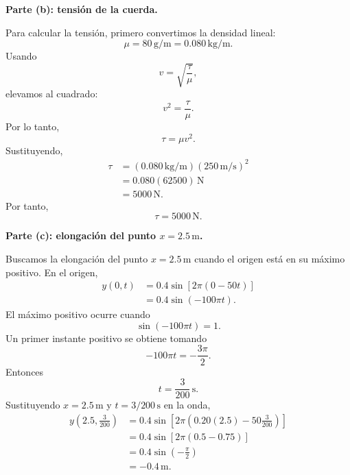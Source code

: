 \documentclass[11pt]{article}
\newcommand{\paso}[1]{%
  \par\medskip
  \noindent\textbf{#1}\par
  \vspace{0.1em}%
}
\begin{document}
\paso{Parte (b): tensi\'on de la cuerda.}
Para calcular la tensi\'on, primero convertimos la densidad lineal:
\begin{equation*}
    \mu=80\,\mathrm{g/m}=0.080\,\mathrm{kg/m}.
\end{equation*}
Usando
\begin{equation*}
    v=\sqrt{\frac{\tau}{\mu}},
\end{equation*}
elevamos al cuadrado:
\begin{equation*}
    v^2=\frac{\tau}{\mu}.
\end{equation*}
Por lo tanto,
\begin{equation*}
    \tau=\mu v^2.
\end{equation*}
Sustituyendo,
\begin{align*}
    \tau
    &=(0.080\,\mathrm{kg/m})(250\,\mathrm{m/s})^2\\
    &=0.080(62500)\,\mathrm{N}\\
    &=5000\,\mathrm{N}.
\end{align*}
Por tanto,
\begin{equation*}
    \boxed{\tau=5000\,\mathrm{N}}.
\end{equation*}

\paso{Parte (c): elongaci\'on del punto $x=2.5\,\mathrm{m}$.}
Buscamos la elongaci\'on del punto $x=2.5\,\mathrm{m}$ cuando el origen est\'a en su m\'aximo positivo. En el origen,
\begin{align*}
    y(0,t)
    &=0.4\sin\left[2\pi(0-50t)\right]\\
    &=0.4\sin(-100\pi t).
\end{align*}
El m\'aximo positivo ocurre cuando
\begin{equation*}
    \sin(-100\pi t)=1.
\end{equation*}
Un primer instante positivo se obtiene tomando
\begin{equation*}
    -100\pi t=-\frac{3\pi}{2}.
\end{equation*}
Entonces
\begin{equation*}
    t=\frac{3}{200}\,\mathrm{s}.
\end{equation*}
Sustituyendo $x=2.5\,\mathrm{m}$ y $t=3/200\,\mathrm{s}$ en la onda,
\begin{align*}
    y\left(2.5,\frac{3}{200}\right)
    &=0.4\sin\left[2\pi\left(0.20(2.5)-50\frac{3}{200}\right)\right]\\
    &=0.4\sin\left[2\pi(0.5-0.75)\right]\\
    &=0.4\sin\left(-\frac{\pi}{2}\right)\\
    &=-0.4\,\mathrm{m}.
\end{align*}
\end{document}
